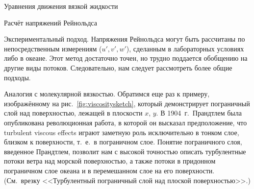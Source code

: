 \begin{chapter}{Уравнения движения вязкой жидкости}
\begin{section}{Расчёт напряжений Рейнольдса}
\begin{paragraph}{Экспериментальный подход.}
Напряжения Рейнольдса могут быть рассчитаны по непосредственным 
измерениям ($u', v', w'$), сделанным в лабораторных условиях либо в океане.
Этот метод достаточно точен, но трудно поддается обобщению на другие виды 
потоков. Следовательно, нам следует рассмотреть более общие подходы.
%
\end{paragraph}

\begin{paragraph}{Аналогия с молекулярной вязкостью.}
Обратимся еще раз к примеру, изображённому на рис.~\ref{fig:viscositysketch}, 
который демонстрирует пограничный слой над поверхностью, лежащей в 
плоскости $x$, $y$. В 1904~г.\ Прандтлем была опубликована революционная 
работа, в которой он высказал предположение, что turbulent viscous effects
играют заметную роль исключительно в тонком слое, близком к поверхности,
т.~е.\ в пограничном слое. Понятие пограничного слоя, введенное Прандтлем,
позволит нам с высокой точностью описать турбулентные потоки ветра над
морской поверхностью, а также потоки в придонном пограничном слое океана и
в перемешанном слое на его поверхности.
(См.\ врезку <<Турбулентный пограничный слой над плоской поверхностью>>.)
%


\end{paragraph}
\end{section}
\end{chapter}

